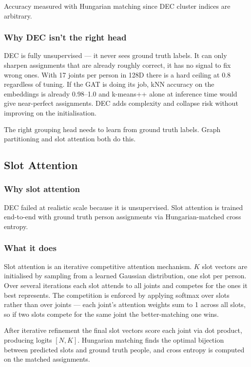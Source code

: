 Accuracy measured with Hungarian matching since DEC cluster indices are arbitrary.


\subsubsection{Why DEC isn't the right head}

DEC is fully unsupervised --- it never sees ground truth labels. It can only sharpen assignments that are already roughly correct, it has no signal to fix wrong ones. With 17 joints per person in 128D there is a hard ceiling at 0.8 regardless of tuning. If the GAT is doing its job, kNN accuracy on the embeddings is already 0.98--1.0 and k-means++ alone at inference time would give near-perfect assignments. DEC adds complexity and collapse risk without improving on the initialisation.

The right grouping head needs to learn from ground truth labels. Graph partitioning and slot attention both do this.


\subsection{Slot Attention}

\subsubsection{Why slot attention}

DEC failed at realistic scale because it is unsupervised. Slot attention is trained end-to-end with ground truth person assignments via Hungarian-matched cross entropy.

\subsubsection{What it does}

Slot attention is an iterative competitive attention mechanism. $K$ slot vectors are initialised by sampling from a learned Gaussian distribution, one slot per person. Over several iterations each slot attends to all joints and competes for the ones it best represents. The competition is enforced by applying softmax over slots rather than over joints --- each joint's attention weights sum to 1 across all slots, so if two slots compete for the same joint the better-matching one wins.

After iterative refinement the final slot vectors score each joint via dot product, producing logits $[N, K]$. Hungarian matching finds the optimal bijection between predicted slots and ground truth people, and cross entropy is computed on the matched assignments.

